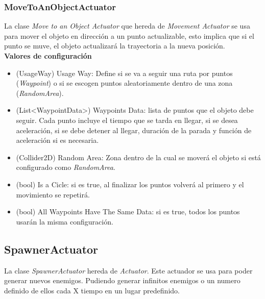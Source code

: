 \subsubsection{MoveToAnObjectActuator}
La clase \textit{Move to an Object Actuator} que hereda de \textit{Movement Actuator} se usa para mover el objeto en  dirección a un punto actualizable, esto implica que si el punto se muve, el objeto actualizará la trayectoria a la nueva posición. \\
\textbf{Valores de configuración}
\begin{itemize} 
	\item (UsageWay) Usage Way: Define si se va a seguir una ruta por puntos (\textit{Waypoint}) o si se escogen puntos aleatoriamente dentro de una zona  (\textit{RandomArea}).
	\item (List<WaypointData>) Waypoints Data: lista de puntos que el objeto debe seguir. Cada punto incluye el tiempo que se tarda en llegar, si se desea aceleración, si se debe detener al llegar, duración de la parada y función de aceleración si es necesaria. 		
	
	 \item (Collider2D) Random Area: Zona dentro de la cual se moverá el objeto si está configurado como \textit{RandomArea}. 
	\item (bool) Is a Cicle: si es true, al finalizar los puntos volverá al primero y el movimiento se repetirá. 
	\item (bool) All Waypoints Have The Same Data: si es true, todos los puntos usarán la misma configuración. 
\end{itemize}

\subsection{SpawnerActuator}
La clase \textit{SpawnerActuator} hereda de \textit{Actuator}. Este actuador se usa para poder generar nuevos enemigos. Pudiendo generar infinitos enemigos o un numero definido de ellos cada X tiempo en un lugar predefinido.

